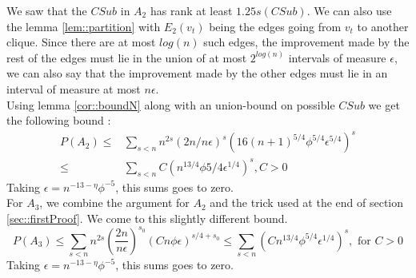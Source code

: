 We saw that the $CSub$ in $A_2$ has rank at least $1.25s(CSub)$. We can also use the lemma \ref{lem::partition} with $E_2(v_t)$ being the edges going from $v_t$ to another clique. Since there are at most $log(n)$ such edges, the improvement made by the rest of the edges must lie in the union of at most $2^{log(n)}$ intervals of measure $\epsilon$, we can also say that the improvement made by the other edges must lie in an interval of measure at most $n\epsilon$.\\
Using lemma \ref{cor::boundN} along with an union-bound on possible $CSub$ we get the following bound :
 \begin{equation*}
 \begin{split}
 P(A_2) \leq &\sum_{s<n}n^{2s}(2n/n\epsilon)^s (16(n + 1)^{5/4}\phi^{5/4}\epsilon^{5/4})^s \\
 \leq & \sum_{s<n} C(n^{13/4}\phi{5/4}\epsilon^{1/4})^s,  C > 0
 \end{split}
 \end{equation*}
 Taking $\epsilon = n^{-13-\eta}\phi^{-5}$, this sums goes to zero.\\
 
 For $A_3$, we combine the argument for $A_2$ and the trick used at the end of section \ref{sec::firstProof}. We come to this slightly different bound.
 \begin{equation*}
P(A_3) \leq  \sum_{s < n}n^{2s}(\dfrac{2n}{n\epsilon})^{s_0}(Cn\phi\epsilon)^{s/4 + s_0} \leq \sum_{s < n}(Cn^{13/4}\phi^{5/4}\epsilon^{1/4})^{s}, \text{ for } C > 0 
\end{equation*}
 Taking $\epsilon = n^{-13-\eta}\phi^{-5}$, this sums goes to zero.

